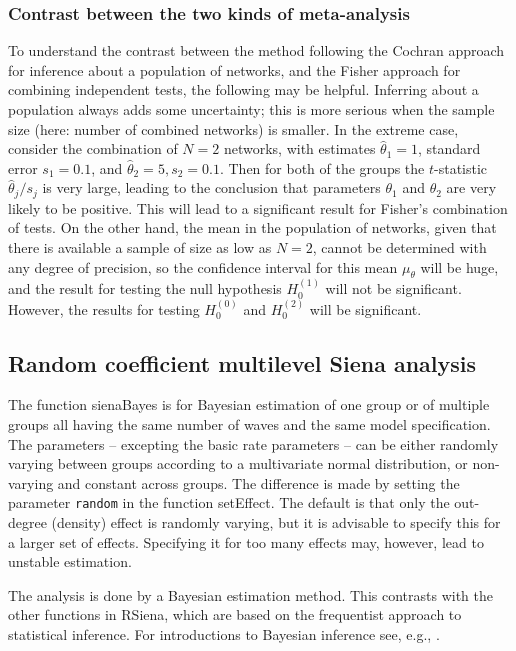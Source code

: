 \documentclass[a4paper,fleqn,11pt]{article}
\newcommand{\+}{\, + \,}
\newcommand{\sfn}[1]{\textsf{#1}}
\newcommand{\rs}{{\sf RSiena}}
\begin{document}
\subsubsection{Contrast between the two kinds of meta-analysis }

To understand the contrast between the method following the Cochran approach
for inference about a population of networks,
and the Fisher approach for combining independent tests, the following
may be helpful.
Inferring about a population always adds some uncertainty;
this is more serious when the sample size (here: number of combined networks)
is smaller.
In the extreme case, consider the combination of $N=2$ networks,
with estimates $\hat\theta_1 = 1$, standard error $s_1 = 0.1$,
and $\hat\theta_2 = 5, s_2 = 0.1$.
Then for both of the groups the $t$-statistic $\hat\theta_j/s_j$ is very large,
leading to the conclusion that parameters $\theta_1$ and $\theta_2$
are very likely to be positive.
This will lead to a significant result for Fisher's combination of tests.
On the other hand, the mean in the population of networks, given that
there is available a sample of size as low as $N=2$, cannot be determined with
any degree of precision, so the confidence interval for this mean $\mu_\theta$
will be huge, and the result for testing the null hypothesis
$H_0^{(1)}$ will not be significant.
However, the results for testing $H_0^{(0)}$ and $H_0^{(2)}$
will be significant.


\subsection{Random coefficient multilevel Siena analysis}
\label{S_sienaBayes}

  The function \sfn{sienaBayes} is for Bayesian estimation of one group or
  of multiple groups all having the same number of waves and the same
  model specification.
  The parameters -- excepting the basic rate parameters -- can be either
  randomly varying between groups according to a multivariate
  normal distribution, or non-varying and constant across groups.
  The difference is made by setting the parameter \texttt{random} in
  the function \sfn{setEffect}. The default is that only the out-degree (density)
  effect is randomly varying, but it is advisable to specify
  this for a larger set of effects.
  Specifying it for too many effects may, however, lead to unstable estimation.

  The analysis is done by a Bayesian estimation method.
  This contrasts with the other functions in \rs, which are based on the
  frequentist approach to statistical inference.
  For introductions to Bayesian inference see, e.g.,
  \citet{KaplanDepaoli2013}.
\end{document}
